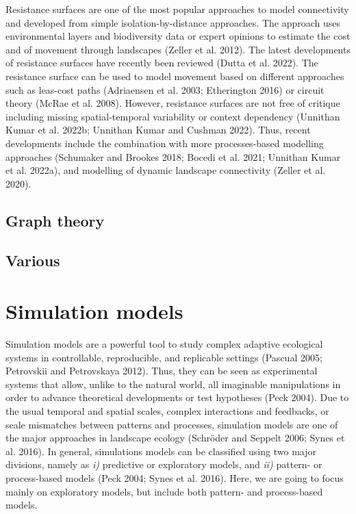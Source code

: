 \documentclass[
  10pt,
  a4paperpaper,
]{article}
\begin{document}
Resistance surfaces are one of the most popular approaches to model
connectivity and developed from simple isolation-by-distance approaches.
The approach uses environmental layers and biodiversity data or expert
opinions to estimate the cost and of movement through landscapes (Zeller
et al. 2012). The latest developments of resistance surfaces have
recently been reviewed (Dutta et al. 2022). The resistance surface can
be used to model movement based on different approaches such as
leas-cost paths (Adriaensen et al. 2003; Etherington 2016) or circuit
theory (McRae et al. 2008). However, resistance surfaces are not free of
critique including missing spatial-temporal variability or context
dependency (Unnithan Kumar et al. 2022b; Unnithan Kumar and Cushman
2022). Thus, recent developments include the combination with more
processes-based modelling approaches (Schumaker and Brookes 2018; Bocedi
et al. 2021; Unnithan Kumar et al. 2022a), and modelling of dynamic
landscape connectivity (Zeller et al. 2020).

\subsection{Graph theory}\label{graph-theory}

\subsection{Various}\label{various}

\section{Simulation models}\label{simulation-models}

Simulation models are a powerful tool to study complex adaptive
ecological systems in controllable, reproducible, and replicable
settings (Pascual 2005; Petrovskii and Petrovskaya 2012). Thus, they can
be seen as experimental systems that allow, unlike to the natural world,
all imaginable manipulations in order to advance theoretical
developments or test hypotheses (Peck 2004). Due to the usual temporal
and spatial scales, complex interactions and feedbacks, or scale
mismatches between patterns and processes, simulation models are one of
the major approaches in landscape ecology (Schröder and Seppelt 2006;
Synes et al. 2016). In general, simulations models can be classified
using two major divisions, namely as \emph{i)} predictive or exploratory
models, and \emph{ii)} pattern- or process-based models (Peck 2004;
Synes et al. 2016). Here, we are going to focus mainly on exploratory
models, but include both pattern- and process-based models.
\end{document}
